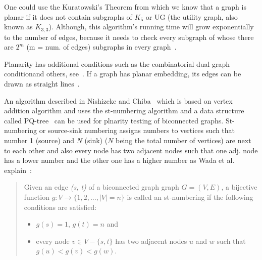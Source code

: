 One could use the Kuratowski's Theorem from which we know that a graph is planar if it does not contain subgraphs
of $ K_5 $ or UG (the utility graph, also known as $ K_{3,3} $). Although, this algorithm's running time will
grow exponentially to the number of edges, because it needs to check every subgraph of whose there are $ 2^m $ 
(m = num. of edges) subgraphs in every graph~\autocite[23]{nishizeki2008planar}.

Planarity has additional conditions such as the combinatorial dual graph conditionand others, 
see~\autocite{weisstein2009planar,weisstein1999dual}. If a graph has planar embedding, its edges can be drawn 
as straight lines~\autocite{fary1948,deo1974graphs,weisstein2009planar}.

An algorithm described in Nishizeke and Chiba~\autocite{nishizeki2008planar} which is based on vertex addition 
algorithm and uses the st-numbering algorithm and a data structure 
called PQ-tree~\autocite[33]{nishizeki2008planar} can be used for plnarity testing of biconnected graphs. 
St-numbering or source-sink numbering assigns numbers to vertices such that number 1 (source) and $ N $ (sink) 
($ N $ being the total number of vertices) are next to each other and also every node has two adjacent nodes 
such that one adj. node has a lower number and the other one has a higher number 
as Wada et al. explain~\autocite[357]{wada1997Biconnected}:

\begin{quote}
  Given an edge \textit{(s, t)} of a biconnected graph graph $ G = (V, E) $, a bijective function $ g: V \rightarrow \{ 1, 2, ..., |V|=n \} $ is called an st-numbering if the following conditions are satisfied:

  \begin{itemize}
  \item $ g(s) = 1 $, $ g(t) = n $ and
    \item every node $ v \in V - \{ s, t \} $ has two adjacent nodes $ u $ and $ w $ such that $ g(u) < g(v) < g(w) $.
  \end{itemize}
\end{quote}




\sloppy
\printbibliography


